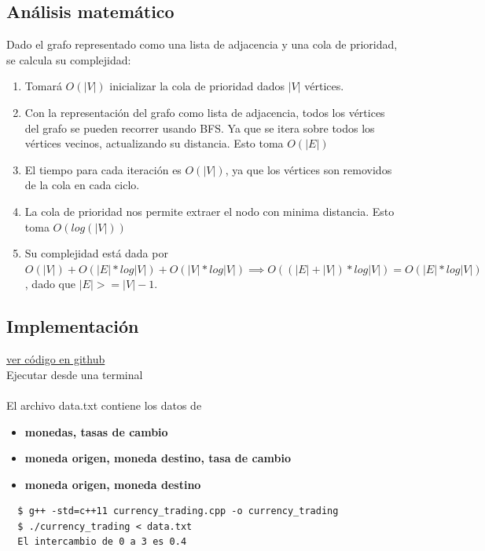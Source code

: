 \documentclass{article}
\begin{document}
\subsection{Análisis matemático}

Dado el grafo representado como una lista de adjacencia y una cola de prioridad, se calcula su complejidad:

\begin{enumerate}
\item Tomará $O(|V|)$ inicializar la cola de prioridad dados $|V|$ vértices.
\item Con la representación del grafo como lista de adjacencia, todos los vértices del grafo se pueden recorrer usando BFS. Ya que se itera sobre todos los vértices vecinos, actualizando su distancia. Esto toma $O(|E|)$
\item El tiempo para cada iteración es $O(|V|)$, ya que los vértices son removidos de la cola en cada ciclo.
\item La cola de prioridad nos permite extraer el nodo con minima distancia. Esto toma $O(log(|V|))$
\item Su complejidad está dada por $O(|V|)+O(|E|*log|V|)+O(|V|*log|V|) \implies O((|E|+|V|)*log|V|) = O(|E|*log|V|)$, dado que $|E|>= |V| - 1$.
\end{enumerate}
\newpage
\subsection{Implementación}
\href{https://github.com/luisballado/ADA/tree/main/practice_code/tarea5/currency_trading}{ver código en github}\\

Ejecutar desde una terminal\\\\

El archivo data.txt contiene los datos de
\begin{itemize}
\item \textbf{monedas, tasas de cambio}
\item \textbf{moneda origen, moneda destino, tasa de cambio}
\item \textbf{moneda origen, moneda destino}
\end{itemize}

\begin{commandline}
\begin{verbatim}
  $ g++ -std=c++11 currency_trading.cpp -o currency_trading
  $ ./currency_trading < data.txt
  El intercambio de 0 a 3 es 0.4
\end{verbatim}
\end{commandline}
\end{document}
